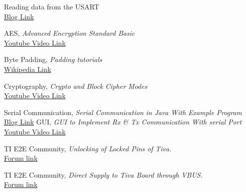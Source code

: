 \documentclass[a4paper,12pt,oneside]{book}
\begin{document}
\begin{thebibliography}{li}



Reading data from the USART\\
\href{http://extremeelectronics.co.in/avr-tutorials/using-the-usart-of-avr-microcontrollers-reading-and-writing-data/}{Blog Link}

AES,  {\em Advanced Encryption Standard Basic}\\
\href{https://www.youtube.com/watch?v=liKXtikP9F0}{Youtube Video Link}

Byte Padding, {\em Padding tutorials}\\
 \href{https://en.wikipedia.org/wiki/Padding\_(cryptography)#Byte\_padding}{Wikipedia Link}

Cryptography, {\em Crypto and Block Cipher Modes } \\
\href{https://www.youtube.com/watch?v=t0pREiDO7_g}{Youtube Video Link}

Serial Communication, {\em Serial Communication in Java With Example Program}\\
\href{https://blog.henrypoon.com/blog/2011/01/01/serial-communication-in-java-with-example-program/}{Blog Link}
GUI, {\em GUI to Implement Rx \& Tx Communication With serial Port}\\
\href{https://www.youtube.com/watch?v=hteeNdA7pOo}{Youtube Video Link}

TI E2E Community, {\em Unlocking of Locked Pins of Tiva.} \\
\href{https://e2e.ti.com/support/microcontrollers/tiva_arm/f/908/t/284566}{Forum link}

TI E2E Community, {\em Direct Supply to Tiva Board through VBUS.} \\
\href{https://e2e.ti.com/support/microcontrollers/tiva_arm/f/908/t/346725}{Forum link}

\end{thebibliography}
\end{document}
